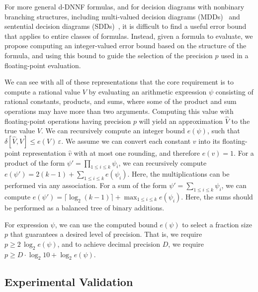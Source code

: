 \documentclass{easychair}
\newcommand{\approximate}[1]{\hat{#1}}
\newcommand{\approxv}{\approximate{v}}
\newcommand{\approxV}{\approximate{V}}
\newcommand{\aerror}{\delta}
\newcommand{\roundepsilon}{\varepsilon}
\begin{document}
For more general d-DNNF formulas, and for decision diagrams with
nonbinary branching structures, including multi-valued decision
diagrams (MDDs)~\cite{srinivasan:iccad:1990} and sentential decision
diagrams (SDDs)~\cite{darwiche:ijcai:2011}, it is difficult to find a
useful error bound that applies to entire classes of formulas.
Instead, given a formula to evaluate,
we propose computing an integer-valued error bound based on the
structure of the formula, and using this bound to guide the selection of
the precision $p$ used in a floating-point evaluation.

We can see with all of these representations that the core requirement
is to compute a rational value $V$ by evaluating an arithmetic
expression $\psi$ consisting of rational constants, products, and
sums, where some of the product and sum operations may have more than
two arguments.  Computing this value with floating-point operations
having precision $p$ will yield an approximation $\approxV$ to the
true value $V$.  We can recursively compute an integer bound $e(\psi)$, such that
$\aerror[\approxV, V] \leq e(V) \,\roundepsilon$.  We assume we
can convert each constant $v$ into its floating-point representation
$\approxv$ with at most one rounding, and therefore $e(v) = 1$.  For a
product of the form $\psi' = \prod_{1 \leq i \leq k} \psi_i$, we can
recursively compute $e(\psi') = 2(k-1) + \sum_{1 \leq i \leq k}
e(\psi_i)$.  Here, the multiplications can be performed via any
association.
For a sum of the form
$\psi' = \sum_{1 \leq i \leq k} \psi_i$, we can compute
$e(\psi') = \lceil \log_2(k-1)\rceil + \max_{1\leq i \leq k} e(\psi_i)$.  Here, the sums should be performed as a balanced tree of binary additions.

For expression $\psi$, we can use the computed bound $e(\psi)$ to
select a fraction size $p$ that guarantees a desired level of
precision.  That is, we require $p \geq 2\,\log_2 e(\psi)$, and to
achieve decimal precision $D$, we require $p \geq D \cdot \log_2 10 +\log_2 e(\psi)$.

\subsection{Experimental Validation}
\end{document}
